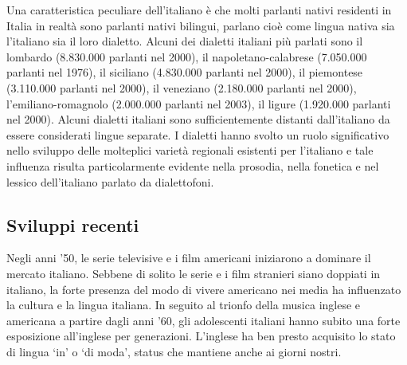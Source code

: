 \begin{multicols}{2}

Una caratteristica peculiare dell'italiano \`{e} che molti parlanti nativi
residenti in Italia in realt\`{a} sono parlanti nativi bilingui, parlano
cio\`{e} come lingua nativa sia l'italiano sia il loro dialetto. Alcuni dei
dialetti italiani pi\`{u} parlati sono il lombardo (8.830.000 parlanti nel
2000), il napoletano-calabrese (7.050.000 parlanti nel 1976), il siciliano
(4.830.000 parlanti nel 2000), il piemontese (3.110.000 parlanti nel 2000), il
veneziano (2.180.000 parlanti nel 2000), l'emiliano-romagnolo (2.000.000 parlanti nel
2003), il ligure (1.920.000 parlanti nel 2000). Alcuni dialetti italiani sono
sufficientemente distanti dall'italiano da essere considerati lingue
separate. I dialetti hanno svolto un ruolo significativo nello sviluppo delle
molteplici variet\`{a} regionali esistenti per l'italiano e tale influenza
risulta particolarmente evidente nella prosodia, nella fonetica e nel lessico
dell'italiano parlato da dialettofoni.

\subsection{Sviluppi recenti}

Negli anni '50, le serie televisive e i film americani iniziarono a dominare
il mercato italiano. Sebbene di solito le serie e i film stranieri siano
doppiati in italiano, la forte presenza del modo di vivere americano nei media
ha influenzato la cultura e la lingua italiana. In seguito al trionfo
della musica inglese e americana a partire dagli anni '60, gli adolescenti
italiani hanno subito una forte esposizione all'inglese per
generazioni. L'inglese ha ben presto acquisito lo stato di lingua `in' o `di
moda', status che mantiene anche ai giorni nostri.


\end{multicols}
